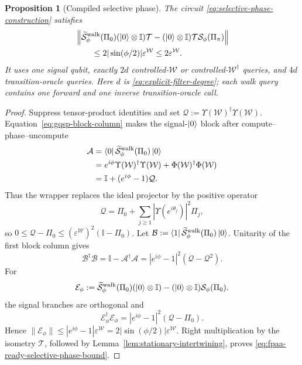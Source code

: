 \documentclass[10pt,conference]{IEEEtran}
\theoremstyle{plain}
\newtheorem{proposition}[theorem]{Proposition}
\theoremstyle{remark}
\begin{document}
\begin{proposition}[Compiled selective phase]
\label{prop:stationary_selective_phase}
The circuit \eqref{eq:selective-phase-construction} satisfies
\begin{equation}
\label{eq:fpaa-ready-selective-phase-bound}
\begin{aligned}
&\left\|\widetilde{\mathcal{S}}^{\mathrm{walk}}_\phi(\Pi_0)
(\ket{0}\otimes \mathbb{I})\mathcal{T}
-(\ket{0}\otimes \mathbb{I})\mathcal{T}
\mathcal{S}_\phi(\Pi_\pi)\right\|\\
&\hspace{2em}\leq
2|\sin(\phi/2)|\varepsilon^{\mathcal{W}}
\leq 2\varepsilon^{\mathcal W}.
\end{aligned}
\end{equation}
It uses one signal qubit, exactly \(2d\)
controlled-\(\mathcal{W}\) or controlled-\(\mathcal W^\dagger\)
queries, and \(4d\) transition-oracle queries.  Here \(d\) is
\eqref{eq:explicit-filter-degree}; each walk query contains one
forward and one inverse transition-oracle call.
\end{proposition}
\begin{proof}
Suppress tensor-product identities and set
\(\mathcal Q:=\Upsilon(\mathcal W)^\dagger\Upsilon(\mathcal W)\).
Equation~\eqref{eq:gqsp-block-column} makes the signal-\(\ket0\)
block after compute--phase--uncompute
\begin{equation}
\begin{aligned}
\mathcal{A}
&= \bra{0}\widetilde{\mathcal{S}}^{\mathrm{walk}}_\phi(\Pi_0)\ket{0} \\
&= e^{i\phi}\Upsilon(\mathcal{W})^\dagger\Upsilon(\mathcal{W})
+ \Phi(\mathcal{W})^\dagger\Phi(\mathcal{W}) \\
&= \mathbb{I} + (e^{i\phi}-1)\mathcal{Q}.
\end{aligned}
\end{equation}
Thus the wrapper replaces the ideal projector by the positive
operator
\[
\mathcal{Q}
=
\Pi_0+\sum_{j\geq1}|\Upsilon(e^{i\theta_j})|^2\Pi_j,
\]
so \(0\leq\mathcal Q-\Pi_0\leq
(\varepsilon^{\mathcal W})^2(\mathbb I-\Pi_0)\).
Let
\(\mathcal B:=\bra1\widetilde{\mathcal S}^{\mathrm{walk}}_\phi(\Pi_0)\ket0\).
Unitarity of the first block column gives
\[
\mathcal B^\dagger\mathcal B
=\mathbb I-\mathcal A^\dagger\mathcal A
=|e^{i\phi}-1|^2(\mathcal Q-\mathcal Q^2).
\]
For
\[
\mathcal{E}_\phi
:=
\widetilde{\mathcal{S}}^{\mathrm{walk}}_\phi(\Pi_0)(\ket{0}\otimes \mathbb{I})
-
(\ket{0}\otimes \mathbb{I})\mathcal{S}_\phi(\Pi_0).
\]
the signal branches are orthogonal and
\[
\mathcal E_\phi^\dagger\mathcal E_\phi
=|e^{i\phi}-1|^2(\mathcal Q-\Pi_0).
\]
Hence
\(\|\mathcal E_\phi\|\leq
|e^{i\phi}-1|\varepsilon^{\mathcal W}
=2|\sin(\phi/2)|\varepsilon^{\mathcal W}\).
Right multiplication by the isometry \(\mathcal T\), followed by
Lemma~\ref{lem:stationary-intertwining}, proves
\eqref{eq:fpaa-ready-selective-phase-bound}.
\end{proof}
\end{document}
